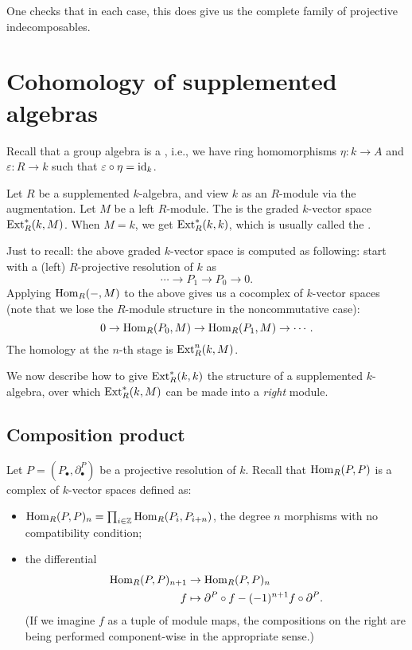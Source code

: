 \documentclass[12pt]{article}
\begin{document}
One checks that in each case, this does give us the complete family of projective indecomposables.

\section{Cohomology of supplemented algebras}

Recall that a group algebra is a , i.e., 
we have ring homomorphisms $\eta \colon k \to A$ and $\varepsilon \colon R \to k$ 
such that $\varepsilon \circ \eta = \operatorname{id}_{k}$.

Let $R$ be a supplemented $k$-algebra, and view $k$ as an $R$-module via the augmentation. 
Let $M$ be a left $R$-module. 
The  is the graded $k$-vector space $\operatorname{Ext}_{R}^{\ast}(k, M)$. \newline
When $M = k$, we get $\operatorname{Ext}_{R}^{\ast}(k, k)$, which is usually called the .

Just to recall: the above graded $k$-vector space is computed as following: 
start with a (left) $R$-projective resolution of $k$ as
\begin{equation*} 
	\cdots \to P_{1} \to P_{0} \to 0.
\end{equation*}
Applying $\operatorname{Hom}_{R}(-, M)$ to the above gives us a cocomplex of $k$-vector spaces (note that we lose the $R$-module structure in the noncommutative case):
\begin{equation*} 
	0 \to \operatorname{Hom}_{R}(P_{0}, M) \to \operatorname{Hom}_{R}(P_{1}, M) \to \cdots.
\end{equation*}
The homology at the $n$-th stage is $\operatorname{Ext}_{R}^{n}(k, M)$.

We now describe how to give $\operatorname{Ext}_{R}^{\ast}(k, k)$ the structure of
a supplemented $k$-algebra, over which $\operatorname{Ext}_{R}^{\ast}(k, M)$ can be made
into a \emph{right} module.

\subsection{Composition product}

Let $P = (P_{\bullet}, \partial^{P}_{\bullet})$ be a projective resolution of $k$. 
Recall that $\operatorname{Hom}_{R}(P, P)$ is a complex of $k$-vector spaces defined as:
\begin{itemize}
	\item $\operatorname{Hom}_{R}(P, P)_{n} = \prod_{i \in \mathbb{Z}} \operatorname{Hom}_{R}(P_{i}, P_{i + n})$, the degree $n$ morphisms with no compatibility condition;
	\item the differential 
	\begin{align*} 
		\operatorname{Hom}_{R}(P, P)_{n + 1} & \to \operatorname{Hom}_{R}(P, P)_{n} \\
		f & \mapsto \partial^{P} \circ f - (-1)^{n + 1} f \circ \partial^{P}.
	\end{align*}
	(If we imagine $f$ as a tuple of module maps, the compositions on the right are being performed component-wise in the appropriate sense.)
\end{itemize}
\end{document}
